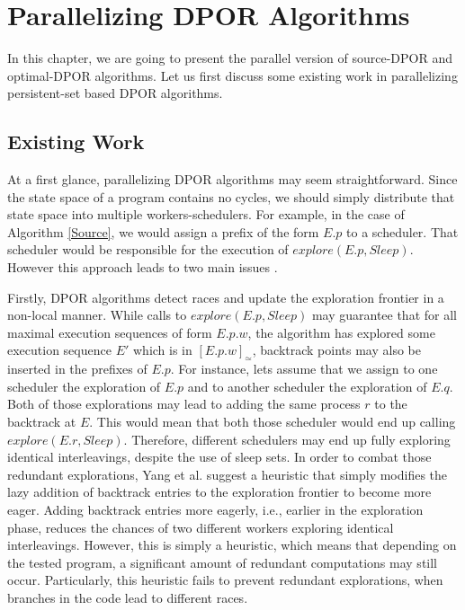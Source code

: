 \chapter{Parallelizing DPOR Algorithms}
\label{paradpor}

In this chapter, we are going to present the parallel version of source-DPOR and optimal-DPOR algorithms. Let us first
discuss some existing work in parallelizing persistent-set based DPOR algorithms.

\section{Existing Work}

At a first glance, parallelizing DPOR algorithms may seem straightforward. Since the state space of a program contains no cycles, 
we should simply distribute that state space into multiple workers-schedulers. For example, in the case of Algorithm \ref{Source}, 
we would assign a prefix of the form $E.p$ to a scheduler. That scheduler would be responsible for the execution of $explore(E.p, Sleep)$.
However this approach leads to two main issues \cite{Yang:2007:DDP:1770532.1770541}.

Firstly, DPOR algorithms detect races and update the exploration frontier in a non-local manner. While calls 
to $explore(E.p, Sleep)$ may guarantee that for all maximal execution 
sequences of form $E.p.w$, the algorithm has explored some execution sequence $E'$ which is in $[E.p.w]_\simeq$, backtrack points
may also be inserted in the prefixes of $E.p$. 
For instance, lets assume that we assign to one scheduler the exploration of $E.p$ and to another scheduler
the exploration of $E.q$. Both of those explorations may lead to adding the same process $r$ to the backtrack at $E$. This would mean that
both those scheduler would end up calling $explore(E.r, Sleep)$. Therefore, different schedulers may end up fully exploring
identical interleavings, despite the use of sleep sets. In order to combat those redundant explorations, 
Yang et al. \cite{Yang:2007:DDP:1770532.1770541} suggest a heuristic
that simply modifies the lazy addition of backtrack entries to the exploration frontier \cite{FlanaganDPOR} to become more eager.
Adding backtrack entries more eagerly, i.e., earlier in the exploration phase, reduces the chances of two different workers
exploring identical interleavings. However, this is simply a heuristic, which means that
depending on the tested program, a significant amount of redundant computations
may still occur. Particularly, this heuristic fails to prevent redundant explorations, when branches in the code lead to different races.

